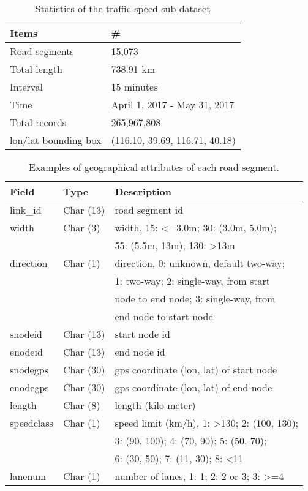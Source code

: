 \begin{table}[htbp]
\centering
\caption{Statistics of the traffic speed sub-dataset}
\label{tab:trafficstats}
\begin{tabular}{ll}
\toprule
Items & \#  \\
\midrule
Road segments & 15,073 \\
Total length & 738.91 km \\
Interval & 15 minutes \\
Time & April 1, 2017 - May 31, 2017 \\
Total records & 265,967,808 \\
lon/lat bounding box &  (116.10, 39.69, 116.71, 40.18) \\
\bottomrule
\end{tabular}
\end{table}


\begin{table}[htbp]
\centering
\caption{Examples of geographical attributes of each road segment.}
\label{tab:linkproperties}
\begin{tabular}{lll}
\toprule
Field & Type & Description  \\
\midrule
link\_id & Char (13) & road segment id \\
width & Char (3) & width, 15: <=3.0m; 30:  (3.0m, 5.0m); \\
 & & 55:  (5.5m, 13m); 130: >13m \\
direction & Char (1) & direction, 0: unknown, default two-way; \\
 & & 1: two-way; 2: single-way, from start \\
 & & node to end node; 3: single-way, from \\
 & & end node to start node \\
snodeid & Char (13) & start node id \\
enodeid & Char (13) & end node id \\
snodegps & Char (30) & gps coordinate (lon, lat) of start node\\
enodegps & Char (30) & gps coordinate (lon, lat) of end node \\
length & Char (8) & length (kilo-meter) \\
speedclass & Char (1) & speed limit (km/h), 1: >130; 2:  (100, 130); \\
 & & 3:  (90, 100); 4:  (70, 90); 5:  (50, 70); \\
 & & 6:  (30, 50);  7:  (11, 30); 8: <11 \\
lanenum & Char (1) & number of lanes, 1: 1; 2: 2 or 3; 3: >=4 \\
\bottomrule
\end{tabular}
\end{table}


